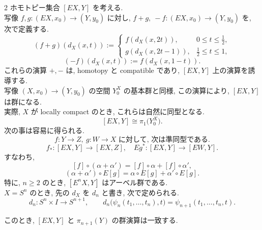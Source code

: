 \documentclass[10pt, leqno]{ltjsarticle}
\newcommand{\Ex}{E}        %
\numberwithin{equation}{section}
\theoremstyle{plain}
\theoremstyle{definition}
\theoremstyle{remark}
\begin{document}
\begin{paracol}{2}
ホモトピー集合 \([EX, Y]\) を考える.\\
写像 $f,g:(\Ex X,x_0)\to(Y,y_0)$ に対し, 
\(f+g,\ -f: (EX,x_0)\to (Y,y_0)\) を, 次で定義する.
\[
(f+g)(d_X(x,t)) :=
\begin{cases}
f(d_X(x,2t)), & 0\le t\le \tfrac12,\\[2mm]
g(d_X(x,2t-1)), & \tfrac12\le t\le 1,
\end{cases}
\]
\[
(-f)(d_X(x, t)) := 
f(d_X(x, 1-t)).
\]
これらの演算 \(+, -\) は, 
 homotopy と compatible であり,
\([EX, Y]\) 上の演算を誘導する.\\
写像 \((X,x_0)\to(Y,y_0)\) の空間 \(Y_0^X\)
の基本群と同様,
この演算により, $[\Ex X,Y]$ は群になる.\\
実際, 
\(X\) が locally compact のとき,
これらは自然に同型となる.
\[
[\Ex X,Y]\cong \pi_1\bigl(Y^X_{0}\bigr).
\]
次の事は容易に得られる.
\begin{equation}
  f:Y\to Z,\ g:W\to X \text{ に対して, 次は準同型である.}
\end{equation}
\[
f_*:[EX, Y] \to [EX,Z],\quad Eg^*:[EX,Y]\to[EW,Y].
\]
すなわち,
\[
[f]\circ(\alpha + \alpha') = [f]\circ\alpha + [f]\circ\alpha',
\]
\[
(\alpha + \alpha')\circ E[g] = \alpha\circ E[g] + \alpha'\circ E[g].
\]
特に, $n\ge 2$ のとき,
\([\Ex^n X,Y]\) はアーベル群である.\\
$X=S^n$ のとき, 先の $d_X$ を $d_n$ と書き, 
次で定められる.
\begin{equation}
d_n:S^n\times I\longrightarrow S^{n+1},\qquad
d_n\bigl(\psi_n(t_1,\ldots,t_n),t\bigr)=\psi_{n+1}(t_1,\ldots,t_n,t).
\end{equation}

このとき, \([\Ex X, Y]\) と \(\pi_{n+1}(Y)\) の群演算は一致する. 





\end{paracol}
\end{document}
